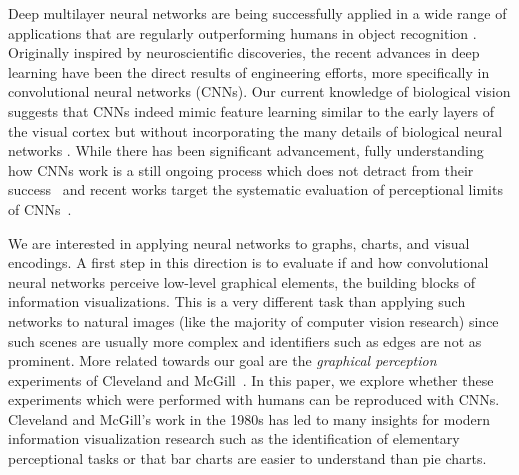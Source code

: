 
\maketitle

Deep multilayer neural networks are being successfully applied in a wide range of applications that are regularly outperforming humans in object recognition \cite{krizhevsky_imagenet2012, simonyan_very_deep2014,szegedy2015}. 
Originally inspired by neuroscientific discoveries, the recent advances in deep learning have been the direct results of engineering efforts, more specifically in convolutional neural networks (CNNs). 
Our current knowledge of biological vision suggests that CNNs indeed mimic feature learning similar to the early layers of the visual cortex but without incorporating the many details of biological neural networks \cite{yamins2016using, hassabis2017neuroscience, human_vs_machine_vision}.
While there has been significant advancement, fully understanding how CNNs work is a still ongoing process which does not detract from their success~\cite{goodfellow_book, deeplearning_blackbox2017} and recent works target the systematic evaluation of perceptional limits of CNNs~\cite{clevr, not_so_clevr}.

We are interested in applying neural networks to graphs, charts, and visual encodings. A first step in this direction is to evaluate if and how convolutional neural networks perceive low-level graphical elements, the building blocks of information visualizations. This is a very different task than applying such networks to natural images (like the majority of computer vision research) since such scenes are usually more complex and identifiers such as edges are not as prominent. More related towards our goal are the \emph{graphical perception} experiments of Cleveland and McGill~\cite{cleveland_mcgill}. In this paper, we explore whether these experiments which were performed with humans can be reproduced with CNNs. Cleveland and McGill's work in the 1980s has led to many insights for modern information visualization research such as the identification of elementary perceptional tasks or that bar charts are easier to understand than pie charts. 

